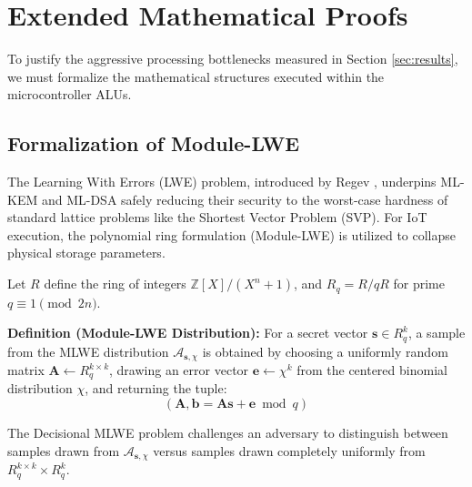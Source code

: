 \section{Extended Mathematical Proofs}
\label{sec:math_proofs}

To justify the aggressive processing bottlenecks measured in Section \ref{sec:results}, we must formalize the mathematical structures executed within the microcontroller ALUs.

\subsection{Formalization of Module-LWE}

The Learning With Errors (LWE) problem, introduced by Regev \cite{regev2009lattices}, underpins ML-KEM and ML-DSA safely reducing their security to the worst-case hardness of standard lattice problems like the Shortest Vector Problem (SVP). For IoT execution, the polynomial ring formulation (Module-LWE) is utilized to collapse physical storage parameters.

Let $R$ define the ring of integers $\mathbb{Z}[X]/(X^n + 1)$, and $R_q = R / qR$ for prime $q \equiv 1 \pmod{2n}$.

\textbf{Definition (Module-LWE Distribution):} For a secret vector $\mathbf{s} \in R_q^k$, a sample from the MLWE distribution $\mathcal{A}_{\mathbf{s},\chi}$ is obtained by choosing a uniformly random matrix $\mathbf{A} \leftarrow R_q^{k \times k}$, drawing an error vector $\mathbf{e} \leftarrow \chi^k$ from the centered binomial distribution $\chi$, and returning the tuple:
\begin{equation}
(\mathbf{A}, \mathbf{b} = \mathbf{A}\mathbf{s} + \mathbf{e} \bmod q)
\end{equation}

The Decisional MLWE problem challenges an adversary to distinguish between samples drawn from $\mathcal{A}_{\mathbf{s},\chi}$ versus samples drawn completely uniformly from $R_q^{k \times k} \times R_q^k$.

